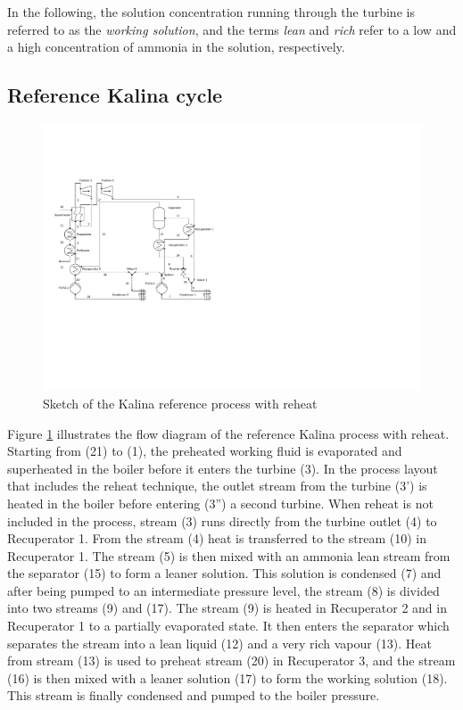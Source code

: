 \documentclass[final,times,5p]{elsarticle}
\begin{document}
In the following, the solution concentration running through the turbine is referred to as the \emph{working solution}, and the terms \emph{lean} and \emph{rich} refer to a low and a high concentration of ammonia in the solution, respectively.

\subsection{Reference Kalina cycle}
\label{sec:kalina_cycle}
\begin{figure}[htbp]
\centering
\includegraphics[width=0.9\linewidth]{Drawing_Kalina_Baseline.pdf}
\caption{Sketch of the Kalina reference process with reheat}
\label{fig:kalina_cycle}
\end{figure}

Figure \ref{fig:kalina_cycle} illustrates the flow diagram of the reference Kalina process with reheat. Starting from (21) to (1), the preheated working fluid is evaporated and superheated in the boiler before it enters the turbine (3). In the process layout that includes the reheat technique, the outlet stream from the turbine (3') is heated in the boiler before entering (3'') a second turbine. When reheat is not included in the process, stream (3) runs directly from the turbine outlet (4) to Recuperator 1. From the stream (4) heat is transferred to the stream (10) in Recuperator 1. The stream (5) is then mixed with an ammonia lean stream from the separator (15) to form a leaner solution. This solution is condensed (7) and after being pumped to an intermediate pressure level, the stream (8) is divided into two streams (9) and (17). The stream (9) is heated in Recuperator 2 and in Recuperator 1 to a partially evaporated state. It then enters the separator which separates the stream into a lean liquid (12) and a very rich vapour (13). Heat from stream (13) is used to preheat stream (20) in Recuperator 3, and the stream (16) is then mixed with a leaner solution (17) to form the working solution (18). This stream is finally condensed and pumped to the boiler pressure. 
\end{document}
